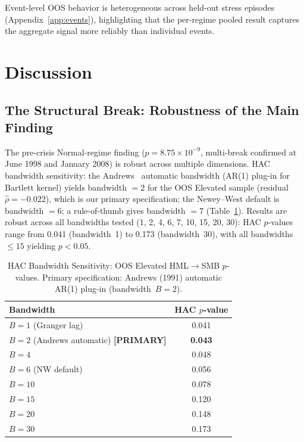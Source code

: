 \documentclass[sigconf,anonymous]{acmart}
\begin{document}
Event-level OOS behavior is heterogeneous across held-out stress episodes
(Appendix~\ref{app:events}), highlighting that the per-regime pooled result
captures the aggregate signal more reliably than individual events.

\section{Discussion}

\subsection{The Structural Break: Robustness of the Main Finding}
\label{sec:robustness}
\label{sec:msvar}
\label{sec:trading}
\label{sec:risk_monitoring}

The pre-crisis Normal-regime finding ($p = 8.75 \times 10^{-9}$, multi-break
confirmed at June 1998 and January 2008) is robust across multiple dimensions.
HAC bandwidth sensitivity: the Andrews~\cite{andrews1991heteroskedasticity} automatic bandwidth
(AR(1) plug-in for Bartlett kernel) yields bandwidth $= 2$ for the OOS Elevated sample
(residual $\hat{\rho} = -0.022$), which is our primary specification; the Newey--West default is bandwidth $= 6$;
a rule-of-thumb gives bandwidth $= 7$ (Table~\ref{tab:bandwidth_sensitivity}).
Results are robust across all bandwidths tested (1, 2, 4, 6, 7, 10, 15, 20, 30):
HAC $p$-values range from 0.041 (bandwidth~1) to 0.173 (bandwidth~30),
with all bandwidths $\leq 15$ yielding $p < 0.05$.

\begin{table}[t]
\centering
\caption{HAC Bandwidth Sensitivity: OOS Elevated HML$\to$SMB $p$-values.
Primary specification: Andrews (1991) automatic AR(1) plug-in (bandwidth~$B = 2$).}
\label{tab:bandwidth_sensitivity}
\small
\begin{tabular}{@{}lc@{}}
\toprule
Bandwidth & HAC $p$-value \\
\midrule
$B = 1$ (Granger lag) & 0.041 \\
$B = 2$ (Andrews automatic) \textbf{[PRIMARY]} & \textbf{0.043} \\
$B = 4$ & 0.048 \\
$B = 6$ (NW default) & 0.056 \\
$B = 10$ & 0.078 \\
$B = 15$ & 0.120 \\
$B = 20$ & 0.148 \\
$B = 30$ & 0.173 \\
\bottomrule
\end{tabular}
\end{table}
\end{document}
